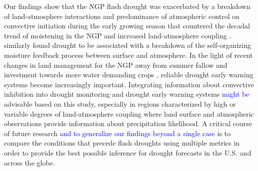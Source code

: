 \documentclass[hess, manuscript]{copernicus}
\def\TG{\textcolor{blue}}
\begin{document}
\conclusions
Our findings show that the NGP flash drought was exacerbated by a breakdown of land-atmosphere interactions and predominance of atmospheric control on convective initiation during the early growing season that countered the decadal trend of moistening in the NGP and increased land-atmosphere coupling \citep{Gerken_2018}. \citet{Ruddell_2009} similarly found drought to be associated with a breakdown of the self-organizing moisture feedback process between surface and atmosphere. In the light of recent changes in land management for the NGP away from summer fallow and investment towards more water demanding crops \citep{Miller_2002, Long_2014}, reliable drought early warning systems become increasingly important. Integrating information about convective inhibition into drought monitoring and drought early warning systems \TG{might be} advisable based on this study, especially in regions characterized by high or variable degrees of land-atmosphere coupling where land surface and atmospheric observations provide information about precipitation likelihood. A critical course of future research \TG{and to generalize our findings beyond a single case} is to compare the conditions that precede flash droughts using multiple metrics in order to provide the best possible inference for drought forecasts in the U.S. and across the globe.












\end{document}
